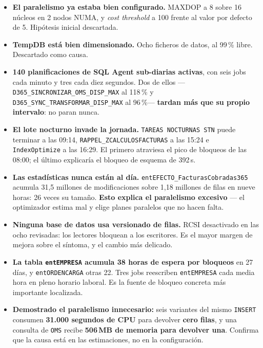 \documentclass[11pt,a4paper]{article}
\newcommand{\cod}[1]{\texttt{\small #1}}
\newcommand{\critico}[1]{\textcolor{rojo}{\textbf{#1}}}
\newcommand{\bien}[1]{\textcolor{verde}{\textbf{#1}}}
\begin{document}
\begin{itemize}
  \item \bien{El paralelismo ya estaba bien configurado.} MAXDOP a 8 sobre
        16 núcleos en 2 nodos NUMA, y \emph{cost threshold} a 100 frente al
        valor por defecto de 5. Hipótesis inicial descartada.
  \item \bien{TempDB está bien dimensionado.} Ocho ficheros de datos, al
        99\,\% libre. Descartado como causa.
  \item \critico{140 planificaciones de SQL Agent sub-diarias activas},
        con seis jobs cada minuto y tres cada diez segundos. Dos de ellos
        —\cod{D365\_SINCRONIZAR\_OMS\_DISP\_MAX} al 118\,\% y
        \cod{D365\_SYNC\_TRANSFORMAR\_DISP\_MAX} al 96\,\%— \textbf{tardan
        más que su propio intervalo}: no paran nunca.
  \item \critico{El lote nocturno invade la jornada.}
        \cod{TAREAS NOCTURNAS STN} puede terminar a las 09:14,
        \cod{RAPPEL\_ZCALCULOSFACTURAS} a las 15:24 e \cod{IndexOptimize} a
        las 16:29. El primero atraviesa el pico de bloqueos de las 08:00; el
        último explicaría el bloqueo de esquema de 392\,s.
  \item \critico{Las estadísticas nunca están al día.}
        \cod{entEFECTO\_FacturasCobradas365} acumula 31,5 millones de
        modificaciones sobre 1,18 millones de filas en nueve horas: 26 veces
        su tamaño. \textbf{Esto explica el paralelismo excesivo} — el
        optimizador estima mal y elige planes paralelos que no hacen falta.
  \item \critico{Ninguna base de datos usa versionado de filas.} RCSI
        desactivado en las ocho revisadas: los lectores bloquean a los
        escritores. Es el mayor margen de mejora sobre el síntoma, y el
        cambio más delicado.
  \item \critico{La tabla \cod{entEMPRESA} acumula 38 horas de espera por
        bloqueos} en 27 días, y \cod{entORDENCARGA} otras 22. Tres jobs
        reescriben \cod{entEMPRESA} cada media hora en pleno horario laboral.
        Es la fuente de bloqueo concreta más importante localizada.
  \item \critico{Demostrado el paralelismo innecesario:} seis variantes del
        mismo \cod{INSERT} consumen \textbf{31.000 segundos de CPU} para
        devolver \textbf{cero filas}, y una consulta de \cod{OMS} recibe
        \textbf{506\,MB de memoria para devolver una}. Confirma que la causa
        está en las estimaciones, no en la configuración.

\end{itemize}
\end{document}
